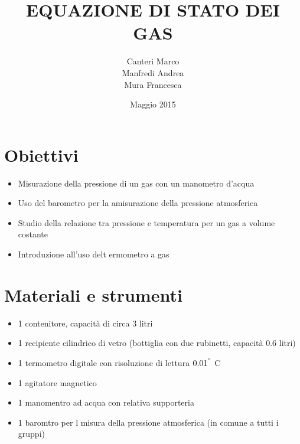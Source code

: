 \documentclass[12pt,titlepage]{article}
\title{\textbf{EQUAZIONE DI STATO DEI GAS} }
\author{Canteri Marco\\Manfredi Andrea\\Mura Francesca}
\date{Maggio 2015}
\begin{document}
	\maketitle
	\tableofcontents
	\renewcommand{\abstractname}{Abstract}
	
	\begin{abstract}
	
	\end{abstract}
	
\newpage
\section{Obiettivi}
\begin{itemize}
\item Misurazione della pressione di un gas con un manometro d'acqua
\item Uso del barometro per la amisurazione della pressione atmosferica
\item Studio della relazione tra pressione e temperatura per un gas a volume costante
\item Introduzione all'uso delt ermometro a gas
\end{itemize}

\section{Materiali e strumenti}
\begin{itemize}
\item 1 contenitore, capacità di circa 3 litri
\item 1 recipiente cilindrico di vetro (bottiglia con due rubinetti, capacità 0.6 litri)
\item 1 termometro digitale con risoluzione di lettura $0.01^{\degree}$ C
\item 1 agitatore magnetico
\item 1 manomentro ad acqua con relativa supporteria
\item 1 baromtro per l misura della pressione atmosferica (in comune a tutti i gruppi)
\end{itemize}

\newpage

\end{document}
